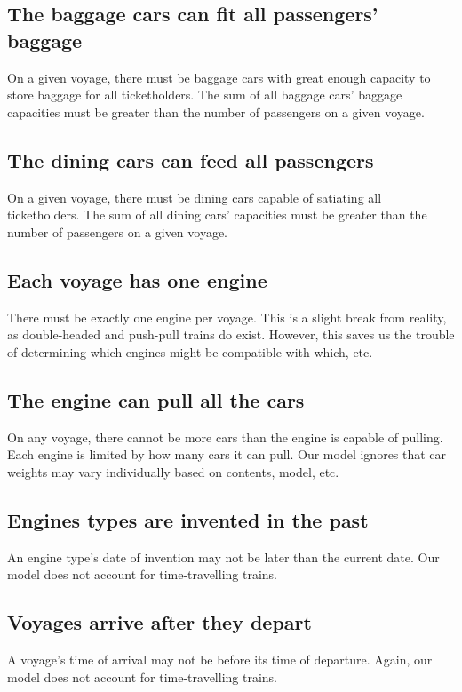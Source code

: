 \documentclass[a4paper]{article}
\begin{document}
\subsection*{The baggage cars can fit all passengers’ baggage}
On a given voyage, there must be baggage cars with great enough capacity to store baggage for all ticketholders. The sum of all baggage cars’ baggage capacities must be greater than the number of passengers on a given voyage.

\subsection*{The dining cars can feed all passengers}
On a given voyage, there must be dining cars capable of satiating all ticketholders. The sum of all dining cars’ capacities must be greater than the number of passengers on a given voyage.

\subsection*{Each voyage has one engine}
There must be exactly one engine per voyage. This is a slight break from reality, as double-headed and push-pull trains do exist. However, this saves us the trouble of determining which engines might be compatible with which, etc.

\subsection*{The engine can pull all the cars}
On any voyage, there cannot be more cars than the engine is capable of pulling. Each engine is limited by how many cars it can pull. Our model ignores that car weights may vary individually based on contents, model, etc.

\subsection*{Engines types are invented in the past}
An engine type’s date of invention may not be later than the current date. Our model does not account for time-travelling trains.

\subsection*{Voyages arrive after they depart}
A voyage’s time of arrival may not be before its time of departure. Again, our model does not account for time-travelling trains.
\end{document}
